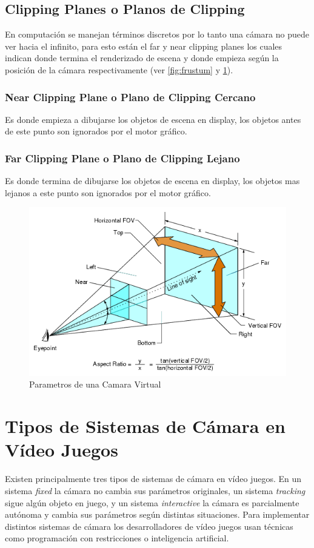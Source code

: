 \subsection{Clipping Planes o Planos de Clipping}
En computación se manejan términos discretos por lo tanto una cámara no puede ver hacia el infinito, para esto están el far y near clipping planes los cuales indican donde termina el renderizado de escena y donde empieza según la posición de la cámara respectivamente (ver \ref{fig:frustum} y \ref{fig:camera}).
\subsubsection{Near Clipping Plane o Plano de Clipping Cercano}
Es donde empieza a dibujarse los objetos de escena en display, los objetos antes de este punto son ignorados por el motor gráfico.
\subsubsection{Far Clipping Plane o Plano de Clipping Lejano}
Es donde termina de dibujarse los objetos de escena en display, los objetos mas lejanos a este punto son ignorados por el motor gráfico.
\begin{figure}[H]
\centering
\includegraphics[width=0.9\linewidth]{semana2/camera.png} 
\caption{Parametros de una Camara Virtual}
\label{fig:camera}
\end{figure}
\newpage
\section{Tipos de Sistemas de Cámara en Vídeo Juegos}
Existen principalmente tres tipos de sistemas de cámara en vídeo juegos. En un sistema \emph{fixed} la cámara no cambia sus parámetros originales, un sistema \emph{tracking} sigue algún objeto en juego, y un sistema \emph{interactive} la cámara es parcialmente autónoma y cambia sus parámetros según distintas situaciones. Para implementar distintos sistemas de cámara los desarrolladores de vídeo juegos usan técnicas como programación con restricciones o inteligencia artificial. 
